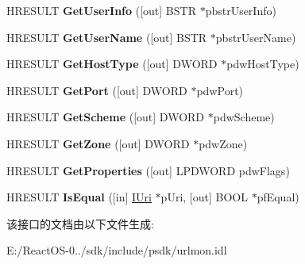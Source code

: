 \begin{DoxyCompactItemize}
H\+R\+E\+S\+U\+LT {\bfseries Get\+User\+Info} (\mbox{[}out\mbox{]} B\+S\+TR $\ast$pbstr\+User\+Info)
\item 
\mbox{\label{interface_i_uri_ad5895476de272a37a4045452ddf0f5d3}} 
H\+R\+E\+S\+U\+LT {\bfseries Get\+User\+Name} (\mbox{[}out\mbox{]} B\+S\+TR $\ast$pbstr\+User\+Name)
\item 
\mbox{\label{interface_i_uri_ad18e42eb60ca19d0cc53749f24adb3dc}} 
H\+R\+E\+S\+U\+LT {\bfseries Get\+Host\+Type} (\mbox{[}out\mbox{]} D\+W\+O\+RD $\ast$pdw\+Host\+Type)
\item 
\mbox{\label{interface_i_uri_ae351bf92f1af28efbc1eab3169fdec29}} 
H\+R\+E\+S\+U\+LT {\bfseries Get\+Port} (\mbox{[}out\mbox{]} D\+W\+O\+RD $\ast$pdw\+Port)
\item 
\mbox{\label{interface_i_uri_a1a3a4b504a224d26f8cb805f9275615d}} 
H\+R\+E\+S\+U\+LT {\bfseries Get\+Scheme} (\mbox{[}out\mbox{]} D\+W\+O\+RD $\ast$pdw\+Scheme)
\item 
\mbox{\label{interface_i_uri_a0a6cf883128298bc4bb0778391743708}} 
H\+R\+E\+S\+U\+LT {\bfseries Get\+Zone} (\mbox{[}out\mbox{]} D\+W\+O\+RD $\ast$pdw\+Zone)
\item 
\mbox{\label{interface_i_uri_a1b9d82cecbaaef53ec2e19f5c1ebf501}} 
H\+R\+E\+S\+U\+LT {\bfseries Get\+Properties} (\mbox{[}out\mbox{]} L\+P\+D\+W\+O\+RD pdw\+Flags)
\item 
\mbox{\label{interface_i_uri_a9e6b2f8b3399a68e5d80c4eee1a4cccd}} 
H\+R\+E\+S\+U\+LT {\bfseries Is\+Equal} (\mbox{[}in\mbox{]} \hyperlink{interface_i_uri}{I\+Uri} $\ast$p\+Uri, \mbox{[}out\mbox{]} B\+O\+OL $\ast$pf\+Equal)
\end{DoxyCompactItemize}


该接口的文档由以下文件生成\+:\begin{DoxyCompactItemize}
\item 
E\+:/\+React\+O\+S-\/0../sdk/include/psdk/urlmon.\+idl\end{DoxyCompactItemize}
